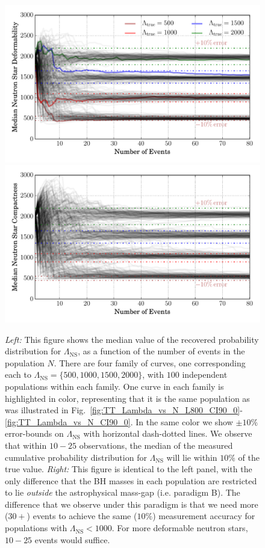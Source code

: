 \documentclass[aps,prd,amsmath,floats,floatfix, twocolumn,
superscriptaddress,nofootinbib,showpacs]{revtex4-1}
\newcommand{\lambdans}{\Lambda_\mathrm{NS}}
\begin{document}
% 
\begin{figure}
\centering
\includegraphics[trim=20 0 0 0, width=1.02\columnwidth]{plots/LambdaMedian_vs_N_AllPopulation}
\includegraphics[trim=20 0 0 0, width=1.02\columnwidth]{plots/LambdaMedian_vs_N_AstroPopulation}
\caption{%
{\it Left:} This figure shows the median value of the recovered
probability distribution for $\lambdans$, as a function of the number of events
in the population $N$. There are four family of curves, one corresponding each
to $\lambdans=\{500,1000,1500,2000\}$, with $100$ independent populations
within each family. One curve in each family is highlighted in color, 
representing that it is the same population as was illustrated in
Fig.~\ref{fig:TT_Lambda_vs_N_L800_CI90_0}-\ref{fig:TT_Lambda_vs_N_CI90_0}.
In the same color we show $\pm 10\%$ error-bounds on $\lambdans$ with
horizontal dash-dotted lines. We observe that within $10-25$ observations, 
the median of the measured cumulative probability distribution for $\lambdans$
will lie within $10\%$ of the true value.
{\it Right:} This figure is identical to the left panel, with the only
difference that the BH masses in each population are restricted to lie
{\it outside} the astrophysical mass-gap (i.e. paradigm B). The difference that
we observe under this paradigm is that we need more ($30+$) events to achieve 
the same ($10\%$) measurement accuracy for populations with $\lambdans<1000$.
For more deformable neutron stars, $10-25$ events would suffice.
}
\label{fig:TT_LambdaMedian_vs_N_AllInOne}
\end{figure}
\end{document}
